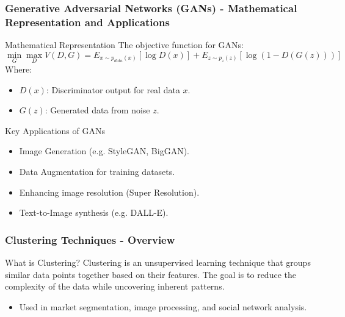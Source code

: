 \documentclass[aspectratio=169]{beamer}
\begin{document}
\begin{frame}[fragile]
    \frametitle{Generative Adversarial Networks (GANs) - Mathematical Representation and Applications}
    \begin{block}{Mathematical Representation}
        The objective function for GANs:
        \begin{equation}
            \min_G \max_D V(D, G) = E_{x \sim p_{data}(x)} [\log D(x)] + E_{z \sim p_z(z)} [\log(1 - D(G(z)))]
        \end{equation}
        Where:
        \begin{itemize}
            \item \( D(x) \): Discriminator output for real data \( x \).
            \item \( G(z) \): Generated data from noise \( z \).
        \end{itemize}
    \end{block}

    \vspace{0.2cm}
    
    \begin{block}{Key Applications of GANs}
        \begin{itemize}
            \item Image Generation (e.g. StyleGAN, BigGAN).
            \item Data Augmentation for training datasets.
            \item Enhancing image resolution (Super Resolution).
            \item Text-to-Image synthesis (e.g. DALL-E).
        \end{itemize}
    \end{block}
\end{frame}

\begin{frame}[fragile]
    \frametitle{Clustering Techniques - Overview}
    \begin{block}{What is Clustering?}
        Clustering is an unsupervised learning technique that groups similar data points together based on their features. The goal is to reduce the complexity of the data while uncovering inherent patterns. 
    \end{block}

    \begin{itemize}
        \item Used in market segmentation, image processing, and social network analysis.
    \end{itemize}
\end{frame}
\end{document}
